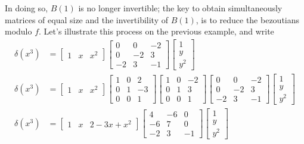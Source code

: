\documentclass{standalone}
\begin{document}
In doing so, $B(1)$ is no longer invertible;
the key to obtain simultaneously matrices of equal size and the invertibility of $B(1)$, is to reduce the bezoutians modulo $f$. 
Let's illustrate this process on the previous example, and write
\begin{align} \nonumber %
	\delta(x^3) &=
	\begin{bmatrix}
			1 & x & x^2
	\end{bmatrix}
	\begin{bmatrix}
		0 & 0 & -2 \\
		0 & -2 & 3 \\
		-2 & 3 & -1
	\end{bmatrix}
	\begin{bmatrix}
		1 \\
		y \\
		y^2
	\end{bmatrix} \\ \nonumber %
	\delta(x^3) &=
	\begin{bmatrix}
		1 & x & x^2
	\end{bmatrix}
	\begin{bmatrix}
		1 & 0 & 2 \\
		0 & 1 & -3 \\
		0 & 0 & 1
	\end{bmatrix}
	\begin{bmatrix}
		1 & 0 & -2 \\
		0 & 1 & 3 \\
		0 & 0 & 1
	\end{bmatrix}
	\begin{bmatrix}
		0 & 0 & -2 \\
		0 & -2 & 3 \\
		-2 & 3 & -1
	\end{bmatrix}
	\begin{bmatrix}
		1 \\
		y \\
		y^2
	\end{bmatrix} \\ \nonumber %
	\delta(x^3) &=
	\begin{bmatrix}
			1 & x & 2 - 3x + x^2
	\end{bmatrix}
	\begin{bmatrix}
		4 & -6 & 0 \\
		-6 & 7 & 0 \\
		-2 & 3 & -1
	\end{bmatrix}
	\begin{bmatrix}
		1 \\
		y \\
		y^2
	\end{bmatrix} \\ \nonumber %
\end{align}
\end{document}
